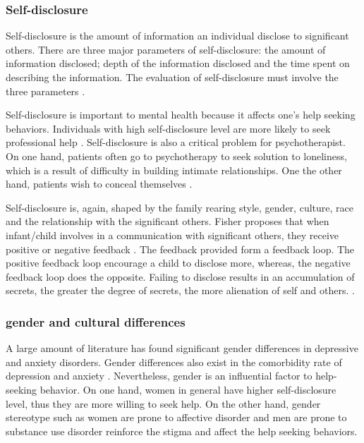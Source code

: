 \subsubsection{Self-disclosure}
Self-disclosure is the amount of information an individual disclose to significant others. There are three major parameters of self-disclosure: the amount of information disclosed; depth of the information disclosed and the time spent on describing the information. The evaluation of self-disclosure must involve the three parameters \cite{cozby1973self}.

Self-disclosure is important to mental health because it affects one's help seeking behaviors. Individuals with high self-disclosure level are more likely to seek professional help \cite{hinson1993willingness}. Self-disclosure is also a critical problem for psychotherapist. On one hand, patients often go to psychotherapy to seek solution to loneliness, which is a result of difficulty in building intimate relationships. One the other hand, patients wish to conceal themselves \cite{fisher1990shared, stricker1990self}. 

Self-disclosure is, again, shaped by the family rearing style, gender, culture, race and the relationship with the significant others. Fisher proposes that when infant/child involves in a communication with significant others, they receive positive or negative feedback \cite{patterson2002recent}. The feedback provided form a feedback loop. The positive feedback loop encourage a child to disclose more, whereas, the negative feedback loop does the opposite. Failing to disclose results in an accumulation of secrets, the greater the degree of secrets, the more alienation of self and others. \cite{patterson2002recent}. 

\subsubsection{gender and cultural differences}
A large amount of literature has found significant gender differences in depressive and anxiety disorders. Gender differences also exist in the comorbidity rate of depression and anxiety \cite{afifi2007gender}. Nevertheless, gender is an influential factor to help-seeking behavior. On one hand, women in general have higher self-disclosure level, thus they are more willing to seek help. On the other hand, gender stereotype such as women are prone to affective disorder and men are prone to substance use disorder reinforce the stigma and affect the help seeking behaviors. 

